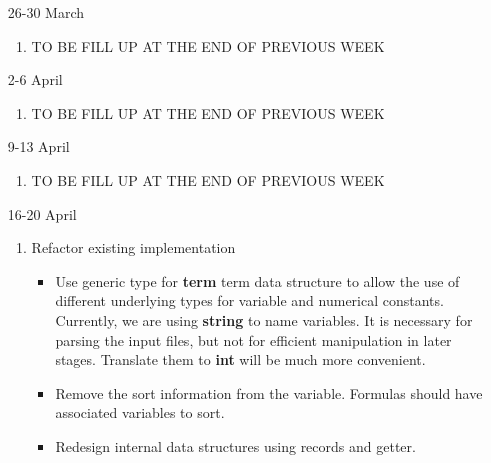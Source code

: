 \documentclass{article}
\begin{document}
\begin{enumerate}
\item [26-30 March]
\begin{enumerate}
\item TO BE FILL UP AT THE END OF PREVIOUS WEEK
\end{enumerate}

\item [2-6 April]
\begin{enumerate}
\item TO BE FILL UP AT THE END OF PREVIOUS WEEK
\end{enumerate}

\item [9-13 April]
\begin{enumerate}
\item TO BE FILL UP AT THE END OF PREVIOUS WEEK
\end{enumerate}

\item [16-20 April]
\begin{enumerate}
\item Refactor existing implementation
\begin{itemize}
\item Use generic type for \textbf{term} term data structure to allow the use of different underlying types for variable and numerical constants.\\
Currently, we are using \textbf{string} to name variables. It is necessary for parsing the input files, but not for efficient manipulation in later stages. Translate them to \textbf{int} will be much more convenient.
\item Remove the sort information from the variable. Formulas should have associated variables to sort.
\item Redesign internal data structures using records and getter.
\end{itemize}
\end{enumerate}

\end{enumerate}
\end{document}

